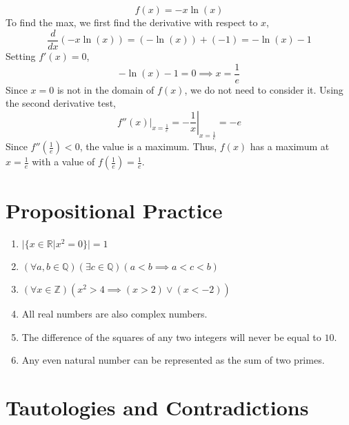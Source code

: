 \documentclass{article}
\newcommand{\Z}{\mathbb{Z}}
\newcommand{\Q}{\mathbb{Q}}
\newcommand{\R}{\mathbb{R}}
\newcommand{\diff}[1]{\frac{d}{d #1}}
\begin{document}
\subsection{}

\begin{equation}
    f(x) = -x \ln(x)
\end{equation}
To find the max, we first find the derivative with respect to \(x\),
\begin{equation}
    \diff{x} (-x \ln(x)) = (-\ln(x)) + (-1) = -\ln(x) - 1
\end{equation}
Setting \(f'(x) = 0\),
\begin{equation}
    -\ln(x) - 1 = 0 \implies x = \frac{1}{e}
\end{equation}
Since \(x = 0\) is not in the domain of \(f(x)\), we do not need to consider it.
Using the second derivative test,
\begin{equation}
    f''(x)|_{x = \frac{1}{e}} = \left.-\frac{1}{x}\right|_{x = \frac{1}{e}} = -e
\end{equation}
Since \(f''\left(\frac{1}{e}\right) < 0\), the value is a maximum.
Thus, \(f(x)\) has a maximum at \(x = \frac{1}{e}\) with a value of \(f\left(\frac{1}{e}\right) = \frac{1}{e}\).

\section{Propositional Practice}

\begin{enumerate}
    \item \(|\{x \in \R | x^2 = 0\}| = 1\)
    \item \((\forall a, b \in \Q)(\exists c \in \Q)(a < b \implies a < c < b)\)
    \item \((\forall x \in \Z)(x^2 > 4 \implies (x > 2) \lor (x < -2))\)
    \item All real numbers are also complex numbers.
    \item The difference of the squares of any two integers will never be equal to \(10\).
    \item Any even natural number can be represented as the sum of two primes.
\end{enumerate}

\section{Tautologies and Contradictions}

\subsection{}
\end{document}

